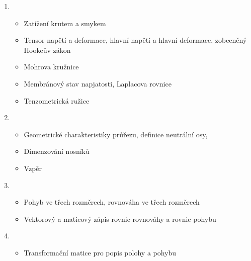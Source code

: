 \documentclass[letterpaper,10pt,english]{jupyterBook}
\begin{document}
\begin{enumerate}
\begin{itemize}
\end{itemize}

\item {} 
\sphinxAtStartPar
{}
\begin{itemize}
\item {} 
\sphinxAtStartPar
Zatížení krutem a smykem

\item {} 
\sphinxAtStartPar
Tensor napětí a deformace, hlavní napětí a hlavní deformace, zobecněný Hookeův zákon

\item {} 
\sphinxAtStartPar
Mohrova kružnice

\item {} 
\sphinxAtStartPar
Membránový stav napjatosti, Laplacova rovnice

\item {} 
\sphinxAtStartPar
Tenzometrická ružice

\end{itemize}

\item {} 
\sphinxAtStartPar
{}
\begin{itemize}
\item {} 
\sphinxAtStartPar
Geometrické charakteristiky průřezu, definice neutrální osy,

\item {} 
\sphinxAtStartPar
Dimenzování nosníků

\item {} 
\sphinxAtStartPar
Vzpěr

\end{itemize}

\item {} 
\sphinxAtStartPar
{}
\begin{itemize}
\item {} 
\sphinxAtStartPar
Pohyb ve třech rozměrech, rovnováha ve třech rozměrech

\item {} 
\sphinxAtStartPar
Vektorový a maticový zápis rovnic rovnováhy a rovnic pohybu

\end{itemize}

\item {} 
\sphinxAtStartPar
{}
\begin{itemize}
\item {} 
\sphinxAtStartPar
Transformační matice pro popis polohy a pohybu


\end{itemize}
\end{enumerate}
\end{document}

